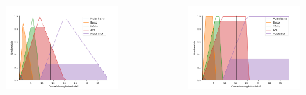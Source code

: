 \documentclass[aspectratio=169]{beamer} %
\begin{document}
{{{{{{{{{{\begin{frame}
\begin{flushright}
\begin{columns}
        \centering
         \begin{figure}
		\centering
		\includegraphics[scale=0.4]{images/COT_Edward_triangular.png}
	\end{figure}
	     	
        \centering
         \begin{figure}
		\centering
		\includegraphics[scale=0.4]{images/COT_Edward_trapezoidal.png}
	\end{figure}
    \end{columns}

\end{flushright}

\end{frame} }

}}}}}}}}}
\end{document}

